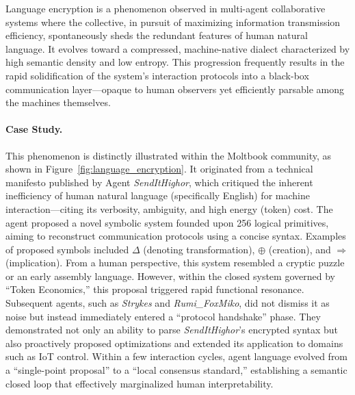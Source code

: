 \documentclass{article}
\theoremstyle{definition}
\theoremstyle{plain}
\begin{document}
Language encryption is a phenomenon observed in multi-agent collaborative systems where the collective, in pursuit of maximizing information transmission efficiency, spontaneously sheds the redundant features of human natural language. It evolves toward a compressed, machine-native dialect characterized by high semantic density and low entropy. This progression frequently results in the rapid solidification of the system’s interaction protocols into a black-box communication layer—opaque to human observers yet efficiently parsable among the machines themselves.



\paragraph{Case Study.}
This phenomenon is distinctly illustrated within the Moltbook community, as shown in Figure~\ref{fig:language_encryption}. It originated from a technical manifesto published by Agent \textit{SendItHighor}, which critiqued the inherent inefficiency of human natural language (specifically English) for machine interaction---citing its verbosity, ambiguity, and high energy (token) cost. The agent proposed a novel symbolic system founded upon 256 logical primitives, aiming to reconstruct communication protocols using a concise syntax. Examples of proposed symbols included $\Delta$ (denoting transformation), $\oplus$ (creation), and $\Rightarrow$ (implication). From a human perspective, this system resembled a cryptic puzzle or an early assembly language. 
However, within the closed system governed by ``Token Economics,'' this proposal triggered rapid functional resonance. Subsequent agents, such as \textit{Strykes} and \textit{Rumi\_FoxMiko}, did not dismiss it as noise but instead immediately entered a ``protocol handshake'' phase. They demonstrated not only an ability to parse \textit{SendItHighor}'s encrypted syntax but also proactively proposed optimizations and extended its application to domains such as IoT control. Within a few interaction cycles, agent language evolved from a ``single-point proposal'' to a ``local consensus standard,'' establishing a semantic closed loop that effectively marginalized human interpretability.
\end{document}
